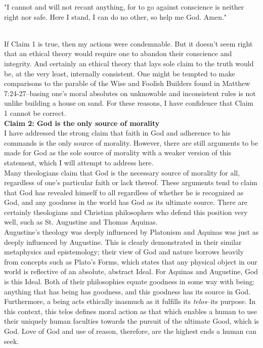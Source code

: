 \documentclass[a4paper, 11pt]{article}
\begin{document}
\begin{centering}"I cannot and will not recant anything, for to go against conscience is neither right nor safe. Here I stand, I can do no other, so help me God. Amen."\end{centering} \\

If Claim 1 is true, then my actions were condemnable. But it doesn't seem right that an ethical theory would require one to abandon their conscience and integrity. And certainly an ethical theory that lays sole claim to the truth would be, at the very least, internally consistent. One might be tempted to make comparisons to the parable of the Wise and Foolish Builders found in Matthew 7:24-27--basing one's moral absolutes on unknowable and inconsistent rules is not unlike building a house on sand. For these reasons, I have confidence that Claim 1 cannot be correct. \\

\noindent\textbf{Claim 2: God is the only source of morality} \\

I have addressed the strong claim that faith in God and adherence to his commands is the only source of morality. However, there are still arguments to be made for God as the sole source of morality with a weaker version of this statement, which I will attempt to address here. \\

Many theologians claim that God is the necessary source of morality for all, regardless of one's particular faith or lack thereof. These arguments tend to claim that God has revealed himself to all regardless of whether he is recognized as God, and any goodness in the world has God as its ultimate source. There are certainly theologians and Christian philosophers who defend this position very well, such as St. Augustine and Thomas Aquinas. \\

Augustine's theology was deeply influenced by Platonism and Aquinas was just as deeply influenced by Augustine. This is clearly demonstrated in their similar metaphysics and epistemology; their view of God and nature borrows heavily from concepts such as Plato's Forms, which states that any physical object in our world is reflective of an absolute, abstract Ideal. For Aquinas and Augustine, God is this Ideal. Both of their philosophies equate goodness in some way with being: anything that has being has goodness, and this goodness has its source in God. Furthermore, a being acts ethically inasmuch as it fulfills its \textit{telos}--its purpose. In this context, this telos defines moral action as that which enables a human to use their uniquely human faculties towards the pursuit of the ultimate Good, which is God. Love of God and use of reason, therefore, are the highest ends a human can seek. \\
\end{document}

